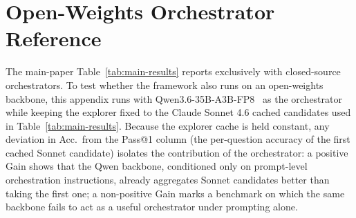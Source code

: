 %
%
%

\section{Open-Weights Orchestrator Reference}
\label{app:qwen36-baseline}

The main-paper Table~\ref{tab:main-results} reports \our{} exclusively with closed-source orchestrators. To test whether the framework also runs on an open-weights backbone, this appendix runs \our{} with Qwen3.6-35B-A3B-FP8~\citep{qwen3_paper} as the orchestrator while keeping the explorer fixed to the Claude Sonnet 4.6 cached candidates used in Table~\ref{tab:main-results}. Because the explorer cache is held constant, any deviation in Acc.\ from the Pass@1 column (the per-question accuracy of the first cached Sonnet candidate) isolates the contribution of the orchestrator: a positive Gain shows that the Qwen backbone, conditioned only on prompt-level orchestration instructions, already aggregates Sonnet candidates better than taking the first one; a non-positive Gain marks a benchmark on which the same backbone fails to act as a useful orchestrator under prompting alone.


